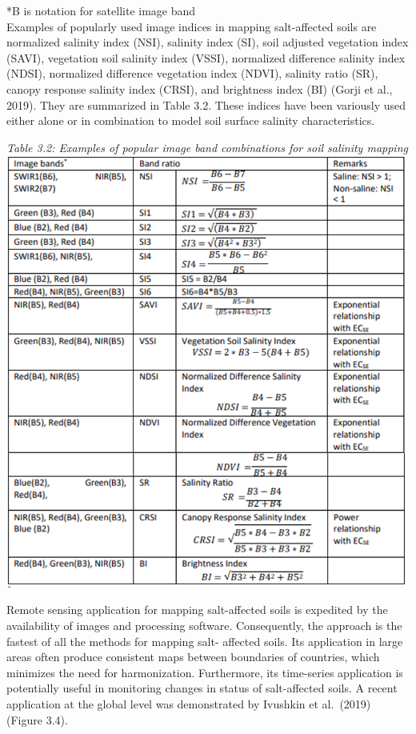 \documentclass[
  10pt,
  b5paper,
]{book}
\begin{document}
*B is notation for satellite image band\\
Examples of popularly used image indices in mapping salt-affected soils are normalized salinity index (NSI), salinity index (SI), soil adjusted vegetation index (SAVI), vegetation soil salinity index (VSSI), normalized difference salinity index (NDSI), normalized difference vegetation index (NDVI), salinity ratio (SR), canopy response salinity index (CRSI), and brightness index (BI) (Gorji et al., 2019). They are summarized in Table
3.2. These indices have been variously used either alone or in combination to model soil surface salinity characteristics.

\emph{Table 3.2: Examples of popular image band combinations for soil salinity mapping}
\includegraphics{figures/tables/Table_3.2.png}

Remote sensing application for mapping salt-affected soils is expedited by the availability of images and processing software. Consequently, the approach is the fastest of all the methods for mapping salt- affected soils. Its application in large areas often produce consistent maps between boundaries of countries, which minimizes the need for harmonization. Furthermore, its time-series application is potentially useful in monitoring changes in status of salt-affected soils. A recent application at the global level was demonstrated by Ivushkin et al.~(2019) (Figure 3.4).
\end{document}
